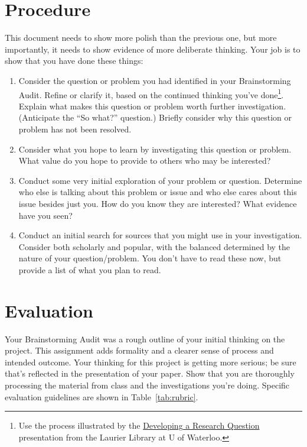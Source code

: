 \documentclass[12pt, oneside]{amsart}	%
\begin{document}
\section{Procedure} %
\label{sec:procedure}
This document needs to show more polish than the previous one, but more importantly, it needs to show evidence of more deliberate thinking. Your job is to show that you have done these things:
\begin{enumerate}
	\item Consider the question or problem you had identified in your Brainstorming Audit. Refine or clarify it, based on the continued thinking you've done\footnote{Use the process illustrated by the \href{http://library.wlu.ca/tutorials/research_question}{Developing a Research Question} presentation from the Laurier Library at U of Waterloo.}. Explain what makes this question or problem worth further investigation. (Anticipate the ``So what?'' question.) Briefly consider why this question or problem has not been resolved.
	\item Consider what you hope to learn by investigating this question or problem. What value do you hope to provide to others who may be interested? 
	\item Conduct some very initial exploration of your problem or question. Determine who else is talking about this problem or issue and who else cares about this issue besides just you. How do you know they are interested? What evidence have you seen?
	\item Conduct an initial search for sources that you might use in your investigation. Consider both scholarly and popular, with the balanced determined by the nature of your question/problem. You don’t have to read these now, but provide a list of what you plan to read.
\end{enumerate}

\section{Evaluation} %
\label{sec:evaluation}
Your Brainstorming Audit was a rough outline of your initial thinking on the project. This assignment adds formality and a clearer sense of process and intended outcome. Your thinking for this project is getting more serious; be sure that's reflected in the presentation of your paper. Show that you are thoroughly processing the material from class and the investigations you're doing. Specific evaluation guidelines are shown in Table~\ref{tab:rubric}.
\end{document}
